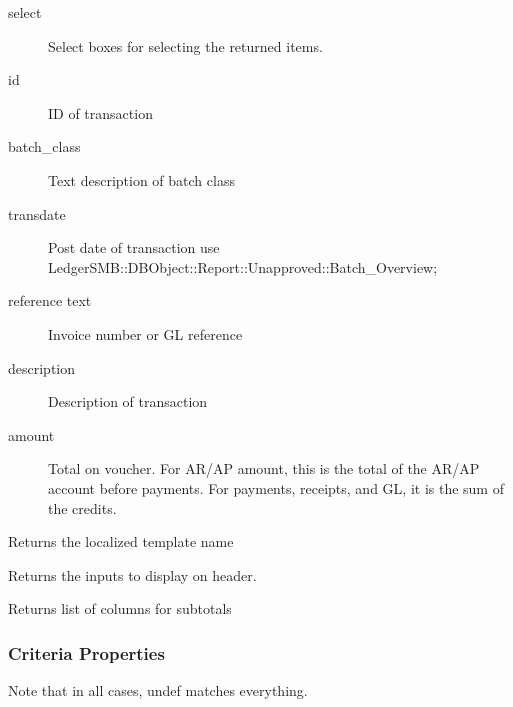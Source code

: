 \begin{description}
\begin{description}
\begin{description}
\begin{description}
\begin{description}
\begin{description}
\begin{description}
\begin{description}
\begin{description}
\begin{description}
\begin{description}
\begin{description}
\item[{select}] \mbox{}

Select boxes for selecting the returned items.


\item[{id}] \mbox{}

ID of transaction


\item[{batch\_class}] \mbox{}

Text description of batch class


\item[{transdate}] \mbox{}

Post date of transaction
use LedgerSMB::DBObject::Report::Unapproved::Batch\_Overview;


\item[{reference text}] \mbox{}

Invoice number or GL reference


\item[{description}] \mbox{}

Description of transaction


\item[{amount}] \mbox{}

Total on voucher.  For AR/AP amount, this is the total of the AR/AP account 
before payments.  For payments, receipts, and GL, it is the sum of the credits.

\end{description}

\item[{name}] \mbox{}

Returns the localized template name


\item[{header\_lines}] \mbox{}

Returns the inputs to display on header.


\item[{subtotal\_cols}] \mbox{}

Returns list of columns for subtotals

\end{description}
\subsubsection*{Criteria Properties\label{LedgerSMB::DBObject::Report::Unapproved::Batch_Detail_Criteria_Properties}}


Note that in all cases, undef matches everything.


\end{description}
\end{description}
\end{description}
\end{description}
\end{description}
\end{description}
\end{description}
\end{description}
\end{description}
\end{description}
